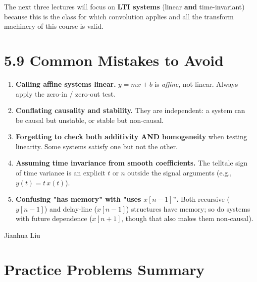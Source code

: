 \documentclass[11pt]{article}
\begin{document}
The next three lectures will focus on \textbf{LTI systems} (linear \textbf{and} time-invariant) because this is the class for which convolution applies and all the transform machinery of this course is valid.

\section*{5.9 Common Mistakes to Avoid}

\begin{enumerate}
  \item \textbf{Calling affine systems linear.} $y = mx + b$ is \textit{affine}, not linear. Always apply the zero-in / zero-out test.
  \item \textbf{Conflating causality and stability.} They are independent: a system can be causal but unstable, or stable but non-causal.
  \item \textbf{Forgetting to check both additivity AND homogeneity} when testing linearity. Some systems satisfy one but not the other.
  \item \textbf{Assuming time invariance from smooth coefficients.} The telltale sign of time variance is an explicit $t$ or $n$ outside the signal arguments (e.g., $y(t) = t\,x(t)$).
  \item \textbf{Confusing "has memory" with "uses $x[n-1]$".} Both recursive ($y[n-1]$) and delay-line ($x[n-1]$) structures have memory; so do systems with future dependence ($x[n+1]$, though that also makes them non-causal).
\end{enumerate}

Jianhua Liu

\section*{Practice Problems Summary}
\end{document}
